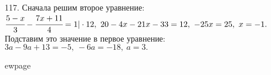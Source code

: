 117. Сначала решим второе уравнение: $\cfrac{5-x}{3}-\cfrac{7x+11}{4}=1|\cdot12,\ 20-4x-21x-33=12,\ -25x=25,\ x=-1.$ Подставим это значение в первое уравнение:
$3a-9a+13=-5,\ -6a=-18,\ a=3.$

ewpage
